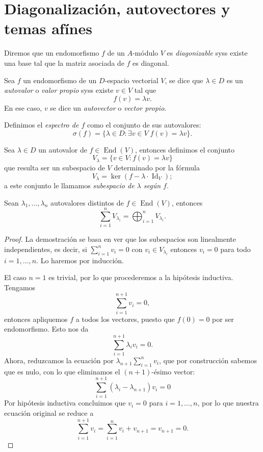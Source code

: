 \documentclass[11pt,oneside]{book}
\DeclareMathOperator{\Id}{Id}
\DeclareMathOperator{\End}{End}
\begin{document}
\section{Diagonalización, autovectores y temas afínes}
\begin{mydef}[Diagonizable]
Diremos que un endomorfismo $f$ de un $A$-módulo $V$ es \textit{diagonizable} syss existe una base tal que la matriz asociada de $f$ es diagonal.
\end{mydef}
\begin{mydef}
Sea $f$ un endomorfismo de un $D$-espacio vectorial $V$, se dice que $\lambda\in D$ es un \textit{autovalor} o \textit{valor propio} syss existe $v\in V$ tal que
$$f(v)=\lambda v.$$
En ese caso, $v$ se dice un \textit{autovector} o \textit{vector propio}.

Definimos el \textit{espectro de $f$} como el conjunto de sus autovalores:
$$\sigma(f)=\{\lambda\in D:\exists v\in V\;f(v)=\lambda v\}.$$
\end{mydef}
\begin{thm}
Sea $\lambda\in D$ un autovalor de $f\in\End(V)$, entonces definimos el conjunto
$$V_\lambda=\{v\in V:f(v)=\lambda v\}$$
que resulta ser un subespacio de $V$ determinado por la fórmula
$$V_\lambda=\ker(f-\lambda\cdot\Id_V);$$
a este conjunto le llamamos \textit{subespacio de $\lambda$ según $f$}.
\end{thm}
\begin{thm}
Sean $\lambda_1,\dots,\lambda_n$ autovalores distintos de $f\in\End(V)$, entonces
$$\sum_{i=1}^n V_{\lambda_i}=\bigoplus_{i=1}^n V_{\lambda_i}.$$
\end{thm}
\begin{proof}
La demostración se basa en ver que los subespacios son linealmente independientes, es decir, si
$\sum_{i=1}^n v_i=0$
con $v_i\in V_{\lambda_i}$ entonces $v_i=0$ para todo $i=1,\dots,n$. Lo haremos por inducción.

El caso $n=1$ es trivial, por lo que procederemos a la hipótesis inductiva. Tengamos
$$\sum_{i=1}^{n+1}v_i=0,$$
entonces apliquemos $f$ a todos los vectores, puesto que $f(0)=0$ por ser endomorfismo. Esto nos da
$$\sum_{i=1}^{n+1}\lambda_i v_i=0.$$
Ahora, reduzcamos la ecuación por $\lambda_{n+1}\sum_{i=1}^n v_i$, que por construcción sabemos que es nulo, con lo que eliminamos el $(n+1)$-ésimo vector:
$$\sum_{i=1}^{n+1}(\lambda_i-\lambda_{n+1})v_i=0$$
Por hipótesis inductiva concluimos que $v_i=0$ para $i=1,\dots,n$, por lo que nuestra ecuación original se reduce a
$$\sum_{i=1}^{n+1}v_i=\sum_{i=1}^nv_i+v_{n+1}=v_{n+1}=0.$$ 
\end{proof}
\end{document}
